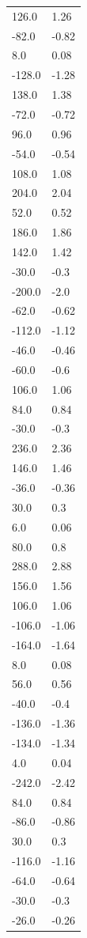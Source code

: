 \begin{longtable}{ll}
126.0 & 1.26 \\
-82.0 & -0.82 \\
8.0 & 0.08 \\
-128.0 & -1.28 \\
138.0 & 1.38 \\
-72.0 & -0.72 \\
96.0 & 0.96 \\
-54.0 & -0.54 \\
108.0 & 1.08 \\
204.0 & 2.04 \\
52.0 & 0.52 \\
186.0 & 1.86 \\
142.0 & 1.42 \\
-30.0 & -0.3 \\
-200.0 & -2.0 \\
-62.0 & -0.62 \\
-112.0 & -1.12 \\
-46.0 & -0.46 \\
-60.0 & -0.6 \\
106.0 & 1.06 \\
84.0 & 0.84 \\
-30.0 & -0.3 \\
236.0 & 2.36 \\
146.0 & 1.46 \\
-36.0 & -0.36 \\
30.0 & 0.3 \\
6.0 & 0.06 \\
80.0 & 0.8 \\
288.0 & 2.88 \\
156.0 & 1.56 \\
106.0 & 1.06 \\
-106.0 & -1.06 \\
-164.0 & -1.64 \\
8.0 & 0.08 \\
56.0 & 0.56 \\
-40.0 & -0.4 \\
-136.0 & -1.36 \\
-134.0 & -1.34 \\
4.0 & 0.04 \\
-242.0 & -2.42 \\
84.0 & 0.84 \\
-86.0 & -0.86 \\
30.0 & 0.3 \\
-116.0 & -1.16 \\
-64.0 & -0.64 \\
-30.0 & -0.3 \\
-26.0 & -0.26 \\

\end{longtable}
